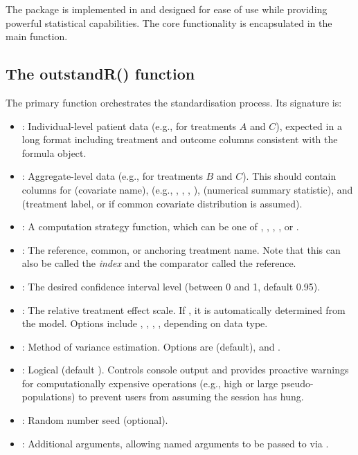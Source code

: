 \documentclass[article]{jss}
\begin{document}
The  package is implemented in  and designed for ease of use while providing powerful statistical capabilities. The core functionality is encapsulated in the main  function.

\subsection{The outstandR() function} \label{ssec:outstandr_function}

The primary function  orchestrates the standardisation process. Its signature is:

\begin{itemize}[noitemsep,topsep=0pt]
    \item {}: Individual-level patient data (e.g., for treatments $A$ and $C$), expected in a long format including treatment and outcome columns consistent with the formula object.
    \item {}: Aggregate-level data (e.g., for treatments $B$ and $C$). This should contain columns for  (covariate name),  (e.g., , , , ),  (numerical summary statistic), and  (treatment label, or  if common covariate distribution is assumed).
    \item {}: A computation strategy function, which can be one of , , , , or .
    \item {}: The reference, common, or anchoring treatment name. Note that this can also be called the {\it index} and the comparator called the reference.
    \item {}: The desired confidence interval level (between 0 and 1, default 0.95).
    \item {}: The relative treatment effect scale. If , it is automatically determined from the model. Options include , , , ,  depending on data type.
    \item {}: Method of variance estimation. Options are  (default),  and .
    \item {}: Logical (default ). Controls console output and provides proactive warnings for computationally expensive operations (e.g., high  or large pseudo-populations) to prevent users from assuming the session has hung.
    \item {}: Random number seed (optional).
    \item {}: Additional arguments, allowing named arguments to be passed to  via .
\end{itemize}
\end{document}
